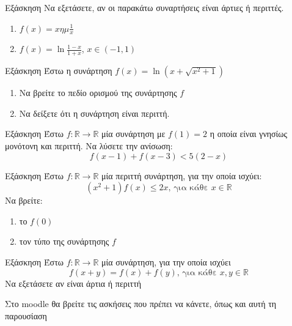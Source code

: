 \documentclass[greek]{beamer}
\begin{document}
\begin{frame}{Εξάσκηση}
 Να εξετάσετε, αν οι παρακάτω συναρτήσεις είναι άρτιες ή περιττές.
 \begin{enumerate}
  \item $f(x)=x ημ \frac{1}{x}$ \pause
  \item $f(x)=\ln \frac{1-x}{1+x}$,  $x\in (-1,1)$
 \end{enumerate}
\end{frame}

\begin{frame}{Εξάσκηση}
 Έστω η συνάρτηση $f(x)=\ln (x+\sqrt{x^2+1})$
 \begin{enumerate}
  \item Να βρείτε το πεδίο ορισμού της συνάρτησης $f$ \pause
  \item Να δείξετε ότι η συνάρτηση είναι περιττή.
 \end{enumerate}
\end{frame}

\begin{frame}{Εξάσκηση}
 Έστω $f:\mathbb{R}\to\mathbb{R}$ μία συνάρτηση με $f(1)=2$ η οποία είναι γνησίως μονότονη και περιττή. Να λύσετε την ανίσωση:
 $$f(x-1)+f(x-3)<5(2-x)$$
\end{frame}

\begin{frame}{Εξάσκηση}
 Έστω $f:\mathbb{R}\to\mathbb{R}$ μία περιττή συνάρτηση, για την οποία ισχύει:
 $$(x^2+1)f(x)\le 2x \text{, για κάθε } x\in\mathbb{R}$$
 Να βρείτε:
 \begin{enumerate}
  \item το $f(0)$ \pause
  \item τον τύπο της συνάρτησης $f$
 \end{enumerate}
\end{frame}

\begin{frame}{Εξάσκηση}
 Έστω $f:\mathbb{R}\to\mathbb{R}$ μία συνάρτηση, για την οποία ισχύει
 $$f(x+y)=f(x)+f(y)\text{, για κάθε } x,y\in\mathbb{R}$$
 Να εξετάσετε αν είναι άρτια ή περιττή
\end{frame}

\begin{frame}
 Στο moodle θα βρείτε τις ασκήσεις που πρέπει να κάνετε, όπως και αυτή τη παρουσίαση
\end{frame}
\end{document}
